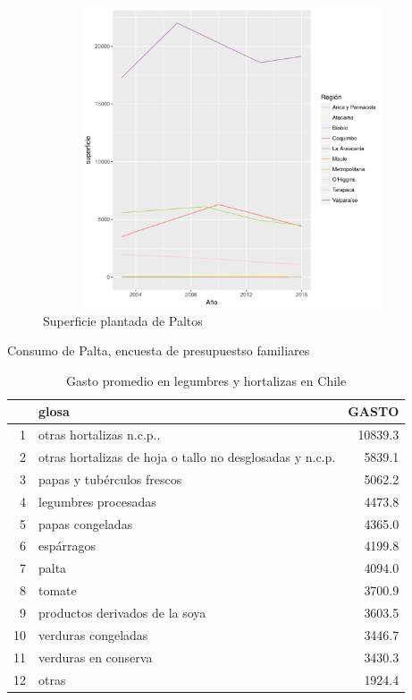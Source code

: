 \documentclass[12pt, twoside]{book}\usepackage[]{graphicx}\usepackage[]{color}
\newenvironment{knitrout}{}{} %
\numberwithin{equation}{section}
\numberwithin{theorem}{section}
\numberwithin{teorema}{section}
\numberwithin{defi}{section}
\numberwithin{prop}{section}
\numberwithin{defi}{section}
\theoremstyle{plain}
\begin{document}
\begin{knitrout}
\color{fgcolor}\begin{figure}[H]

{\centering \includegraphics[width=4.5in,height=3.5in]{figure/unnamed-chunk-5-1} 

}

\caption[Superficie plantada de Paltos\label{Paltos}]{Superficie plantada de Paltos\label{Paltos}}\label{fig:unnamed-chunk-5}
\end{figure}


\end{knitrout}


Consumo de Palta, encuesta de presupuestso familiares



\begin{table}[ht]
\centering
\begin{tabular}{rlr}
  \hline
 & glosa & GASTO \\ 
  \hline
1 & otras hortalizas n.c.p.. & 10839.3 \\ 
  2 & otras hortalizas de hoja o tallo no desglosadas y n.c.p. & 5839.1 \\ 
  3 & papas y tubérculos frescos & 5062.2 \\ 
  4 & legumbres procesadas & 4473.8 \\ 
  5 & papas congeladas & 4365.0 \\ 
  6 & espárragos & 4199.8 \\ 
  7 & palta & 4094.0 \\ 
  8 & tomate & 3700.9 \\ 
  9 & productos derivados de la soya & 3603.5 \\ 
  10 & verduras congeladas & 3446.7 \\ 
  11 & verduras en conserva & 3430.3 \\ 
  12 & otras & 1924.4 \\ 
   \hline
\end{tabular}
\caption{Gasto promedio en legumbres y hortalizas en Chile} 
\end{table}
\end{document}
